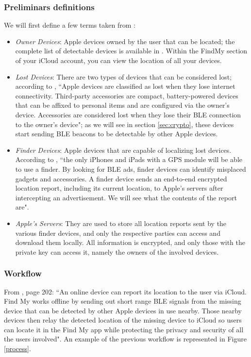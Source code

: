 \documentclass[english]{article}
\begin{document}
\subsubsection{Preliminars definitions}
We will first define a few terms taken from \cite{whocanfind}:
\begin{itemize}
  \item \textit{Owner Devices}: Apple devices owned by the user that can be located; the complete list of detectable devices is available in \cite{Apple}. Within the FindMy section of your iCloud account, you can view the location of all your devices.
  \item \textit{Lost Devices}: There are two types of devices that can be considered lost; according to \cite{whocanfind}, ``Apple devices are classified as lost when they lose internet connectivity. Third-party accessories \cite{gadget} are compact, battery-powered devices that can be affixed to personal items and are configured via the owner's device. Accessories are considered lost when they lose their BLE connection to the owner's device"; as we will see in section \ref{sec:crypto}, these devices start sending BLE beacons to be detectable by other Apple devices.
  \item \textit{Finder Devices}: Apple devices that are capable of localizing lost devices. According to \cite{whocanfind}, ``the only iPhones and iPads with a GPS module will be able to use a finder. By looking for BLE ads, finder devices can identify misplaced gadgets and accessories. A finder device sends an end-to-end encrypted location report, including its current location, to Apple's servers after intercepting an advertisement. We will see what the contents of the report are".
  \item \textit{Apple’s Servers}: They are used to store all location reports sent by the various finder devices, and only the respective parties can access and download them locally. All information is encrypted, and only those with the private key can access it, namely the owners of the involved devices.
\end{itemize}
\subsubsection{Workflow}
From \cite{aps}, page 202: ``An online device can report its location to the user via iCloud. Find My works offline by sending out short range BLE signals from the missing device that can be detected by other Apple devices in use nearby. Those nearby devices then relay the detected location of the missing device to iCloud so users can locate it in the Find My app while protecting the privacy and security of all the users involved". An example of the previous workflow is represented in Figure \ref{process}.
\end{document}
